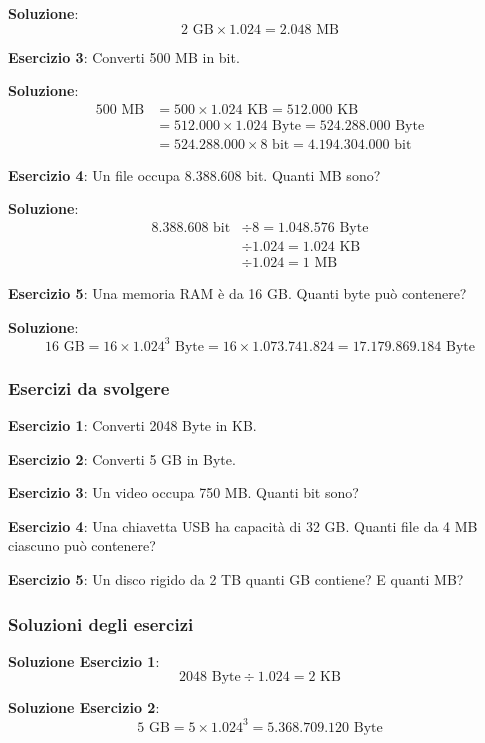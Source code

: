 \documentclass[12pt,a4paper]{article}
\begin{document}
\textbf{Soluzione}:
\[
2 \text{ GB} \times 1.024 = 2.048 \text{ MB}
\]

\textbf{Esercizio 3}: Converti 500 MB in bit.

\textbf{Soluzione}:
\begin{align*}
500 \text{ MB} &= 500 \times 1.024 \text{ KB} = 512.000 \text{ KB} \\
&= 512.000 \times 1.024 \text{ Byte} = 524.288.000 \text{ Byte} \\
&= 524.288.000 \times 8 \text{ bit} = 4.194.304.000 \text{ bit}
\end{align*}

\textbf{Esercizio 4}: Un file occupa 8.388.608 bit. Quanti MB sono?

\textbf{Soluzione}:
\begin{align*}
8.388.608 \text{ bit} &\div 8 = 1.048.576 \text{ Byte} \\
&\div 1.024 = 1.024 \text{ KB} \\
&\div 1.024 = 1 \text{ MB}
\end{align*}

\textbf{Esercizio 5}: Una memoria RAM è da 16 GB. Quanti byte può contenere?

\textbf{Soluzione}:
\[
16 \text{ GB} = 16 \times 1.024^3 \text{ Byte} = 16 \times 1.073.741.824 = 17.179.869.184 \text{ Byte}
\]

\subsubsection{Esercizi da svolgere}

\textbf{Esercizio 1}: Converti 2048 Byte in KB.

\textbf{Esercizio 2}: Converti 5 GB in Byte.

\textbf{Esercizio 3}: Un video occupa 750 MB. Quanti bit sono?

\textbf{Esercizio 4}: Una chiavetta USB ha capacità di 32 GB. Quanti file da 4 MB ciascuno può contenere?

\textbf{Esercizio 5}: Un disco rigido da 2 TB quanti GB contiene? E quanti MB?

\subsubsection{Soluzioni degli esercizi}

\textbf{Soluzione Esercizio 1}: 
\[
2048 \text{ Byte} \div 1.024 = 2 \text{ KB}
\]

\textbf{Soluzione Esercizio 2}:
\[
5 \text{ GB} = 5 \times 1.024^3 = 5.368.709.120 \text{ Byte}
\]
\end{document}

